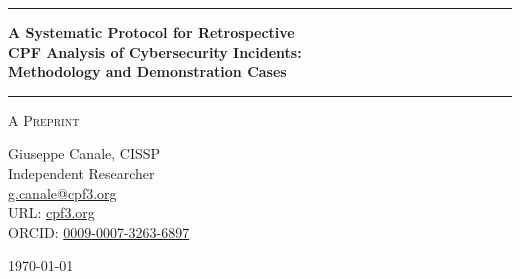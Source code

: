 \documentclass[11pt,a4paper]{article}
\begin{document}
\thispagestyle{empty}
\begin{center}

\vspace*{0.5cm}

\rule{\textwidth}{1.5pt}

\vspace{0.5cm}

{\LARGE \textbf{A Systematic Protocol for Retrospective}}\\[0.3cm]
{\LARGE \textbf{CPF Analysis of Cybersecurity Incidents:}}\\[0.3cm]
{\LARGE \textbf{Methodology and Demonstration Cases}}

\vspace{0.5cm}

\rule{\textwidth}{1.5pt}

\vspace{0.3cm}

{\large \textsc{A Preprint}}

\vspace{0.5cm}

{\Large Giuseppe Canale, CISSP}\\[0.2cm]
Independent Researcher\\[0.1cm]
\href{mailto:g.canale@cpf3.org}{g.canale@cpf3.org}\\[0.1cm]
URL: \href{https://cpf3.org}{cpf3.org}\\[0.1cm]
ORCID: \href{https://orcid.org/0009-0007-3263-6897}{0009-0007-3263-6897}

\vspace{0.8cm}

{\large \today}

\vspace{1cm}

\end{center}
\end{document}
